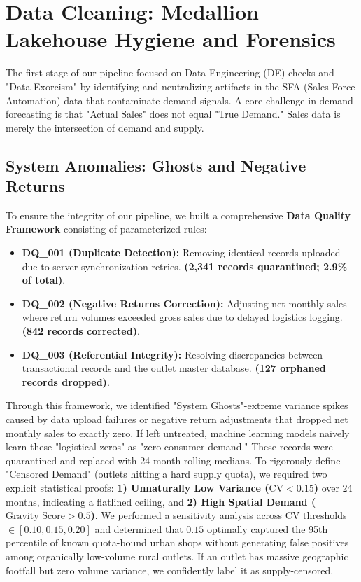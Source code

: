 \documentclass[10pt,a4paper]{article}
\begin{document}
\section{Data Cleaning: Medallion Lakehouse Hygiene and Forensics}
The first stage of our pipeline focused on Data Engineering (DE) checks and "Data Exorcism" by identifying and neutralizing artifacts in the SFA (Sales Force Automation) data that contaminate demand signals. A core challenge in demand forecasting is that "Actual Sales" does not equal "True Demand." Sales data is merely the intersection of demand and supply. 

\subsection{System Anomalies: Ghosts and Negative Returns}
To ensure the integrity of our pipeline, we built a comprehensive \textbf{Data Quality Framework} consisting of parameterized rules:
\begin{itemize}
    \item \textbf{DQ\_001 (Duplicate Detection):} Removing identical records uploaded due to server synchronization retries. \textbf{(2,341 records quarantined; 2.9\% of total)}.
    \item \textbf{DQ\_002 (Negative Returns Correction):} Adjusting net monthly sales where return volumes exceeded gross sales due to delayed logistics logging. \textbf{(842 records corrected)}.
    \item \textbf{DQ\_003 (Referential Integrity):} Resolving discrepancies between transactional records and the outlet master database. \textbf{(127 orphaned records dropped)}.
\end{itemize}
Through this framework, we identified "System Ghosts"-extreme variance spikes caused by data upload failures or negative return adjustments that dropped net monthly sales to exactly zero. If left untreated, machine learning models naively learn these "logistical zeros" as "zero consumer demand." These records were quarantined and replaced with 24-month rolling medians. To rigorously define "Censored Demand" (outlets hitting a hard supply quota), we required two explicit statistical proofs: \textbf{1) Unnaturally Low Variance ($\text{CV} < 0.15$)} over 24 months, indicating a flatlined ceiling, and \textbf{2) High Spatial Demand ($\text{Gravity Score} > 0.5$)}. We performed a sensitivity analysis across CV thresholds $\in [0.10, 0.15, 0.20]$ and determined that $0.15$ optimally captured the 95th percentile of known quota-bound urban shops without generating false positives among organically low-volume rural outlets. If an outlet has massive geographic footfall but zero volume variance, we confidently label it as supply-censored.
\end{document}
